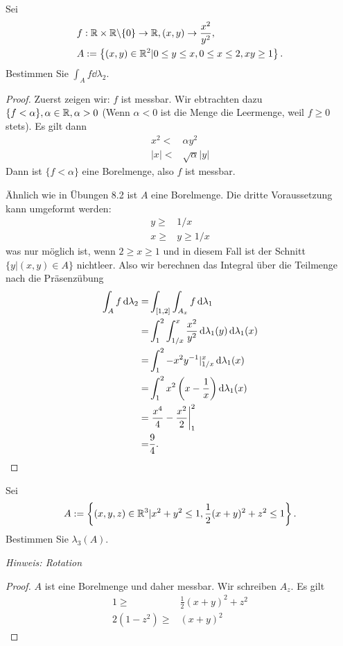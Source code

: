 \begin{Problem}
	Sei
	\begin{align*}
&		f:\mathbb{R}\times \mathbb{R}\backslash \{0\} \to \mathbb{R}, (x,y)\to \frac{x^2}{y^2},\\
&		A:=\left\{ (x,y)\in \mathbb{R}^2|0\le y\le x, 0\le x \le 2, xy\ge 1 \right\} .
	\end{align*}
	Bestimmen Sie $\int_A f\dd{\lambda_2}$.
\end{Problem}
\begin{proof}
	Zuerst zeigen wir: $f$ ist messbar. Wir ebtrachten dazu $\{f< \alpha\} ,\alpha\in \mathbb{R},\alpha >0$ (Wenn $\alpha<0$ ist die Menge die Leermenge, weil $f\ge 0$ stets). Es gilt dann
	\begin{align*}
		x^2<& \alpha y^2\\
		|x|<&\sqrt{\alpha}|y|
	\end{align*}
	Dann ist $\{f<\alpha\} $ eine Borelmenge, also $f$ ist messbar.

	Ähnlich wie in Übungen 8.2 ist $A$ eine Borelmenge. Die dritte Voraussetzung kann umgeformt werden:
	\begin{align*}
		y\ge& 1 / x\\
		x \ge& y \ge 1 / x
	\end{align*}
	was nur möglich ist, wenn $2\ge x\ge 1$ und in diesem Fall ist der Schnitt $\{y|(x,y)\in A\} $ nichtleer. Also wir berechnen das Integral über die Teilmenge nach die Präsenzübung
	\begin{align*}
		\int_A f\dd{\lambda_2}=&\int_{[1,2]}\int_{A_x} f\dd{\lambda_1}\\
		=&\int_1^2 \int_{1 / x}^x \frac{x^2}{y^2}\dd{\lambda_1(y)}\dd{\lambda_1(x)}\\
		=&\int_1^2 -x^2 y^{-1}|_{1 / x}^x\dd{\lambda_1(x)}\\
		=&\int_1^2 x^2\left( x-\frac{1}{x} \right) \dd{\lambda_1(x)}\\
		=& \left.\frac{x^4}{4}-\frac{x^2}{2}\right|_1^2\\
			=&\frac{9}{4}.\qedhere
	\end{align*}
\end{proof}
\begin{Problem}
	Sei
	\[
	A:=\left\{ (x,y,z)\in \mathbb{R}^3|x^2+y^2\le 1,\frac{1}{2}(x+y)^2+z^2\le 1 \right\} 
	.\] 
	Bestimmen Sie $\lambda_3(A)$.

	{\footnotesize \emph{Hinweis: Rotation}}
\end{Problem}
\begin{proof}
	$A$ ist eine Borelmenge und daher messbar. Wir schreiben $A_z$. Es gilt
	\begin{align*}
		1\ge& \frac{1}{2}(x+y)^2+z^2\\
		2(1-z^2)\ge& (x+y)^2
	\end{align*}
\end{proof}

